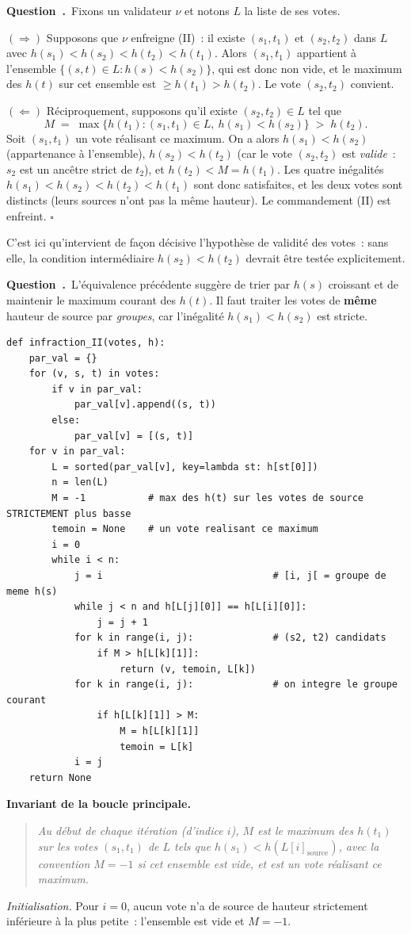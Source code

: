 \documentclass[11pt,a4paper]{article}
\renewcommand{\Q}{\medskip\par\stepcounter{qcnt}\noindent\textbf{\color{cnc}Question~\theqcnt.}~}
\begin{document}
\Q Fixons un validateur $\nu$ et notons $L$ la liste de ses votes.

$(\Rightarrow)$ Supposons que $\nu$ enfreigne (II)~: il existe $(s_1,t_1)$ et $(s_2,t_2)$
dans $L$ avec $h(s_1)<h(s_2)<h(t_2)<h(t_1)$. Alors $(s_1,t_1)$ appartient à l'ensemble
$\{(s,t)\in L : h(s)<h(s_2)\}$, qui est donc non vide, et le maximum des $h(t)$ sur cet
ensemble est $\ge h(t_1) > h(t_2)$. Le vote $(s_2,t_2)$ convient.

$(\Leftarrow)$ Réciproquement, supposons qu'il existe $(s_2,t_2)\in L$ tel que
\[ M \;=\; \max\{h(t_1) : (s_1,t_1)\in L,\ h(s_1)<h(s_2)\} \;>\; h(t_2). \]
Soit $(s_1,t_1)$ un vote réalisant ce maximum. On a alors
$h(s_1)<h(s_2)$ (appartenance à l'ensemble), $h(s_2)<h(t_2)$ (car le vote $(s_2,t_2)$ est
\emph{valide}~: $s_2$ est un ancêtre strict de $t_2$), et $h(t_2)<M=h(t_1)$. Les quatre
inégalités $h(s_1)<h(s_2)<h(t_2)<h(t_1)$ sont donc satisfaites, et les deux votes sont
distincts (leurs sources n'ont pas la même hauteur). Le commandement (II) est enfreint.
\hfill$\square$

C'est ici qu'intervient de façon décisive l'hypothèse de validité des votes~: sans elle, la
condition intermédiaire $h(s_2)<h(t_2)$ devrait être testée explicitement.

\Q L'équivalence précédente suggère de trier par $h(s)$ croissant et de maintenir le maximum
courant des $h(t)$. Il faut traiter les votes de \textbf{même} hauteur de source par
\emph{groupes}, car l'inégalité $h(s_1)<h(s_2)$ est stricte.
\begin{lstlisting}
def infraction_II(votes, h):
    par_val = {}
    for (v, s, t) in votes:
        if v in par_val:
            par_val[v].append((s, t))
        else:
            par_val[v] = [(s, t)]
    for v in par_val:
        L = sorted(par_val[v], key=lambda st: h[st[0]])
        n = len(L)
        M = -1           # max des h(t) sur les votes de source STRICTEMENT plus basse
        temoin = None    # un vote realisant ce maximum
        i = 0
        while i < n:
            j = i                              # [i, j[ = groupe de meme h(s)
            while j < n and h[L[j][0]] == h[L[i][0]]:
                j = j + 1
            for k in range(i, j):              # (s2, t2) candidats
                if M > h[L[k][1]]:
                    return (v, temoin, L[k])
            for k in range(i, j):              # on integre le groupe courant
                if h[L[k][1]] > M:
                    M = h[L[k][1]]
                    temoin = L[k]
            i = j
    return None
\end{lstlisting}
\textbf{Invariant de la boucle principale.}
\begin{quote}\itshape
Au début de chaque itération (d'indice $i$), $M$ est le maximum des $h(t_1)$ sur les votes
$(s_1,t_1)$ de $L$ tels que $h(s_1)<h(L[i]_{\text{source}})$, avec la convention
$M=-1$ si cet ensemble est vide, et  est un vote réalisant ce maximum.
\end{quote}
\emph{Initialisation.} Pour $i=0$, aucun vote n'a de source de hauteur strictement inférieure
à la plus petite~: l'ensemble est vide et $M=-1$.
\end{document}

